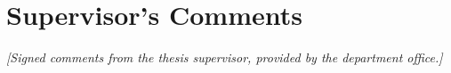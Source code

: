 \chapter*{Supervisor's Comments}
\label{advisor-comments}

\textit{[Signed comments from the thesis supervisor, provided by the
department office.]}
